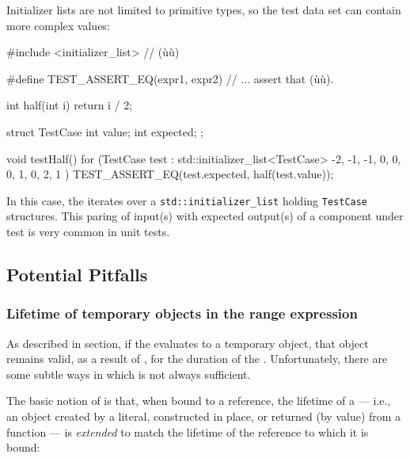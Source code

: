 {{Initializer lists are not limited to primitive types, so the test data
set can contain more complex values:

\begin{emcppslisting}
#include <initializer_list>  // (ù{}ù)

#define TEST_ASSERT_EQ(expr1, expr2)  // ... assert that (ù{}ù).

int half(int i)
{
    return i / 2;
}

struct TestCase
{
    int value;
    int expected;
};

void testHalf()
{
    for (TestCase test : std::initializer_list<TestCase>{
        {-2, -1}, {-1, 0}, {0, 0}, {1, 0}, {2, 1}
    })
    {
        TEST_ASSERT_EQ(test.expected, half(test.value));
    }
}
\end{emcppslisting}
    

\noindent In this case, the  iterates over a
\lstinline!std::initializer_list! holding \lstinline!TestCase! structures.
This paring of input(s) with expected output(s) of a component under
test is very common in unit tests.

\subsection[Potential Pitfalls]{Potential Pitfalls}\label{potential-pitfalls}

\subsubsection[Lifetime of temporary objects in the range expression]{Lifetime of temporary objects in the range expression}\label{lifetime-of-temporary-objects-in-the-range-expression}

As described in  section, if the  evaluates to a temporary object, that object remains valid,
as a result of , for the duration of the
. Unfortunately, there are some
subtle ways in which  is not always
sufficient.

The basic notion of  is that, when bound to a
reference, the lifetime of a  --- i.e., an object
created by a literal, constructed in place, or returned (by value) from
a function --- is \emph{extended} to match the lifetime of the reference
to which it is bound:

}}
